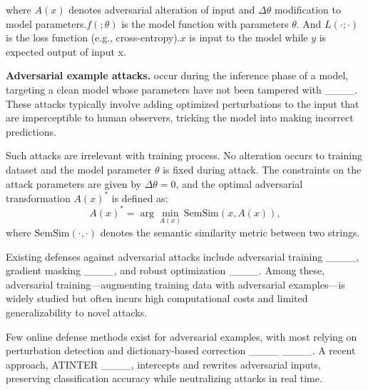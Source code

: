 where $A(x)$ denotes adversarial alteration of input and $\Delta\theta$  modification to model parameters.$f(;\theta)$ is the model function with parameters $\theta$. And $L(\cdot;\cdot)$ is the loss function (e.g., cross-entropy).$x$ is input to the model while $y$ is expected output of input x.


\textbf{Adversarial example attacks.} occur during the inference phase of a model, targeting a clean model whose parameters have not been tampered with ____. These attacks typically involve adding optimized perturbations to the input that are imperceptible to human observers, tricking the model into making incorrect predictions. 

Such attacks are irrelevant with training process. No alteration occurs to training dataset and the model parameter $\theta$ is fixed during attack. The constraints on the attack parameters are given by $\Delta\theta = 0$, and the optimal adversarial transformation \( A(x)^* \) is defined as:
\begin{equation}
A(x)^* = \arg\min_{A(x)} \text{SemSim}(x, A(x)),
\end{equation}
where \( \text{SemSim}(\cdot, \cdot) \) denotes the semantic similarity metric between two strings.

Existing defenses against adversarial attacks include adversarial training ____, gradient masking ____, and robust optimization ____. Among these, adversarial training—augmenting training data with adversarial examples—is widely studied but often incurs high computational costs and limited generalizability to novel attacks.

Few online defense methods exist for adversarial examples, with most relying on perturbation detection and dictionary-based correction ____ ____. A recent approach, ATINTER ____, intercepts and rewrites adversarial inputs, preserving classification accuracy while neutralizing attacks in real time.





